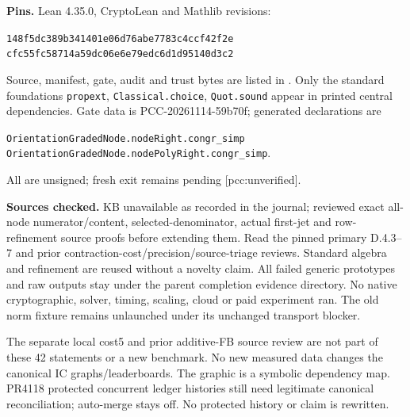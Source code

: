 \documentclass[10pt]{article}
\begin{document}
\textbf{Pins.} Lean 4.35.0, CryptoLean and Mathlib revisions:
\begin{center}\small
\texttt{148f5dc389b341401e06d76abe7783c4ccf42f2e}\\
\texttt{cfc55fc58714a59dc06e6e79edc6d1d95140d3c2}
\end{center}
Source, manifest, gate, audit and trust bytes are listed in
. Only the standard foundations
\texttt{propext}, \texttt{Classical.choice}, \texttt{Quot.sound} appear in
printed central dependencies. Gate data is PCC-20261114-59b70f; generated declarations are
\begin{center}\small
\texttt{OrientationGradedNode.nodeRight.congr\_simp}\\
\texttt{OrientationGradedNode.nodePolyRight.congr\_simp}.
\end{center}
All are unsigned; fresh exit remains pending [pcc:unverified].

\textbf{Sources checked.} KB unavailable as recorded in the journal;
reviewed exact all-node numerator/content, selected-denominator, actual
first-jet and row-refinement source proofs before extending them. Read the
pinned primary D.4.3--7 and prior contraction-cost/precision/source-triage
reviews. Standard algebra and refinement are reused without a novelty claim.
All failed generic prototypes and raw outputs stay under the parent completion
evidence directory. No native cryptographic, solver, timing, scaling, cloud
or paid experiment ran. The old norm fixture remains unlaunched under its
unchanged transport blocker.

The separate local cost5 and prior additive-FB source review are not part of
these 42 statements or a new benchmark. No new measured data changes the
canonical IC graphs/leaderboards. The graphic is a symbolic dependency map.
PR4118 protected concurrent ledger histories still need legitimate canonical
reconciliation; auto-merge stays off. No protected history or claim is rewritten.
\end{document}
